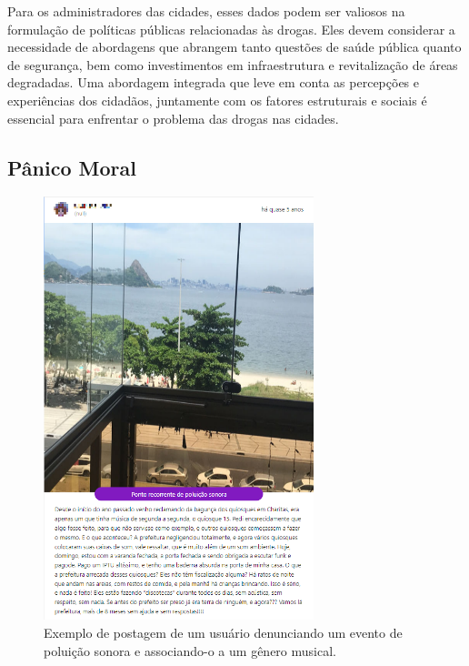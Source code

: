 Para os administradores das cidades, esses dados podem ser valiosos na formulação de políticas públicas relacionadas às drogas. Eles devem considerar a necessidade de abordagens que abrangem tanto questões de saúde pública quanto de segurança, bem como investimentos em infraestrutura e revitalização de áreas degradadas. Uma abordagem integrada que leve em conta as percepções e experiências dos cidadãos, juntamente com os fatores estruturais e sociais é essencial para enfrentar o problema das drogas nas cidades.

\subsection{Pânico Moral}

\begin{figure}[htb]
	\centering
	\includegraphics[width=0.7\textwidth]{images/colab_posts_karen.png}
	\caption{Exemplo de postagem de um usuário denunciando um evento de poluição sonora e associando-o a um gênero musical.}
	\label{fig:colab_posts_karen}
\end{figure}

